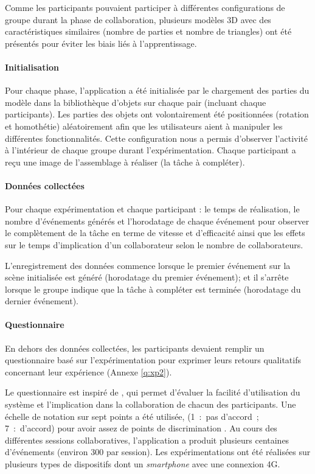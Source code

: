 Comme les participants pouvaient participer à différentes configurations de 
groupe durant la phase de collaboration, plusieurs modèles \gls{3D} avec des 
caractéristiques similaires (nombre de parties et nombre de triangles) ont été 
présentés pour éviter les biais liés à l'apprentissage.


\paragraph{Initialisation}

Pour chaque phase, l'application a été initialisée par le chargement des parties du 
modèle dans la bibliothèque d'objets sur chaque pair (incluant chaque 
participants). Les parties des 
objets ont volontairement été positionnées (rotation et homothétie) aléatoirement 
afin que les utilisateurs aient à manipuler les différentes fonctionnalités. Cette 
configuration nous a permis d'observer l'activité à l'intérieur de chaque groupe 
durant l'expérimentation. Chaque participant a reçu une image de l'assemblage à 
réaliser (la tâche à compléter). 

\paragraph{Données collectées}
Pour chaque expérimentation et chaque participant : le temps de réalisation, le 
nombre d'événements générés et l'horodatage de chaque événement pour 
observer le complètement de la tâche en terme de vitesse et d'efficacité ainsi 
que les effets sur le temps d'implication d'un collaborateur selon le nombre de 
collaborateurs. 

L'enregistrement des données commence lorsque le premier événement sur la 
scène initialisée est généré (horodatage du premier événement); et il s'arrête 
lorsque le groupe indique que la tâche à compléter est terminée (horodatage du 
dernier événement).


\paragraph{Questionnaire}
En dehors des données collectées, les participants devaient remplir un 
questionnaire basé sur l'expérimentation pour exprimer leurs retours qualitatifs 
concernant leur expérience (Annexe \ref{q:xp2}). 

Le questionnaire est inspiré de \cite{Lewis1995}, qui permet d'évaluer la facilité 
d'utilisation du système et l'implication dans la collaboration de chacun des 
participants. Une échelle de notation sur sept points a été utilisée, 
(1~:~pas d'accord~; 7~:~d'accord) pour avoir assez de points de discrimination \cite{Lewis1993}.
Au cours des différentes sessions collaboratives, l'application a produit plusieurs 
centaines d'événements (environ 300 par session). Les expérimentations ont été 
réalisées sur plusieurs types de dispositifs dont un \textit{smartphone} avec une 
connexion 4G. 



